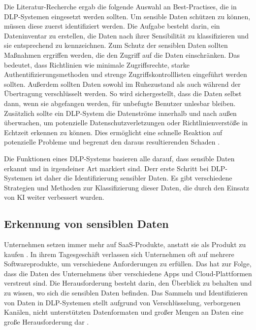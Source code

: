 Die Literatur-Recherche ergab die folgende Auswahl an Best-Practises, die in DLP-Systemen eingesetzt werden sollten. Um sensible Daten schützen zu können, müssen diese zuerst identifiziert werden. Die Aufgabe besteht darin, ein Dateninventar zu erstellen, die Daten nach ihrer Sensibilität zu klassifizieren und sie entsprechend zu kennzeichnen. Zum Schutz der sensiblen Daten sollten Maßnahmen ergriffen werden, die den Zugriff auf die Daten einschränken. Das bedeutet, dass Richtlinien wie minimale Zugriffsrechte, starke Authentifizierungsmethoden und strenge Zugriffskontrolllisten eingeführt werden sollten. Außerdem sollten Daten sowohl im Ruhezustand als auch während der Übertragung verschlüsselt werden. So wird sichergestellt, dass die Daten selbst dann, wenn sie abgefangen werden, für unbefugte Benutzer unlesbar bleiben. Zusätzlich sollte ein DLP-System die Datenströme innerhalb und nach außen überwachen, um potenzielle Datenschutzverletzungen oder Richtlinienverstöße in Echtzeit erkennen zu können. Dies ermöglicht eine schnelle Reaktion auf potenzielle Probleme und begrenzt den daraus resultierenden Schaden \cite{Hussain.2022}\cite{HerreraMontano.2022}\cite{Shishodia.2022}. %

Die Funktionen eines DLP-Systems basieren alle darauf, dass sensible Daten erkannt und in irgendeiner Art markiert sind. Derr erste Schritt bei DLP-Systemen ist daher die Identifizierung sensibler Daten. Es gibt verschiedene Strategien und Methoden zur Klassifizierung dieser Daten, die durch den Einsatz von KI weiter verbessert wurden.

\subsection{Erkennung von sensiblen Daten}
Unternehmen setzen immer mehr auf SaaS-Produkte, anstatt sie als Produkt zu kaufen \cite{Gartner.2023}. In ihrem Tagesgeschäft verlassen sich Unternehmen oft auf mehrere Softwareprodukte, um verschiedene Anforderungen zu erfüllen. Das hat zur Folge, dass die Daten des Unternehmens über verschiedene Apps und Cloud-Plattformen verstreut sind. Die Herausforderung besteht darin, den Überblick zu behalten und zu wissen, wo sich die sensiblen Daten befinden. Das Sammeln und Identifizieren von Daten in DLP-Systemen stellt aufgrund von Verschlüsselung, verborgenen Kanälen, nicht unterstützten Datenformaten und großer Mengen an Daten eine große Herausforderung dar \cite{Hauer.2015}.


